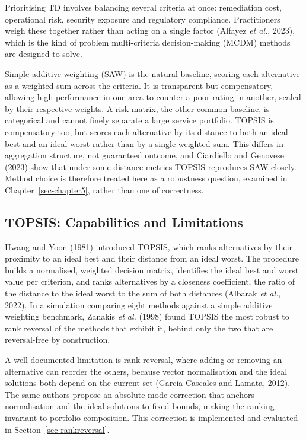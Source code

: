 \documentclass[
  12pt,
  letterpaper,
  12pt,
  oneside,
  english,
  onehalfspacing,
  headsepline]{MastersDoctoralThesis}
\begin{document}
Prioritising TD involves balancing several criteria at once: remediation
cost, operational risk, security exposure and regulatory compliance.
Practitioners weigh these together rather than acting on a single factor
(Alfayez \emph{et al.}, 2023), which is the kind of problem
multi-criteria decision-making (MCDM) methods are designed to solve.

Simple additive weighting (SAW) is the natural baseline, scoring each
alternative as a weighted sum across the criteria. It is transparent but
compensatory, allowing high performance in one area to counter a poor
rating in another, scaled by their respective weights. A risk matrix,
the other common baseline, is categorical and cannot finely separate a
large service portfolio. TOPSIS is compensatory too, but scores each
alternative by its distance to both an ideal best and an ideal worst
rather than by a single weighted sum. This differs in aggregation
structure, not guaranteed outcome, and Ciardiello and Genovese (2023)
show that under some distance metrics TOPSIS reproduces SAW closely.
Method choice is therefore treated here as a robustness question,
examined in Chapter~\ref{sec-chapter5}, rather than one of correctness.

\subsection{TOPSIS: Capabilities and
Limitations}\label{topsis-capabilities-and-limitations}

Hwang and Yoon (1981) introduced TOPSIS, which ranks alternatives by
their proximity to an ideal best and their distance from an ideal worst.
The procedure builds a normalised, weighted decision matrix, identifies
the ideal best and worst value per criterion, and ranks alternatives by
a closeness coefficient, the ratio of the distance to the ideal worst to
the sum of both distances (Albarak \emph{et al.}, 2022). In a simulation
comparing eight methods against a simple additive weighting benchmark,
Zanakis \emph{et al.} (1998) found TOPSIS the most robust to rank
reversal of the methods that exhibit it, behind only the two that are
reversal-free by construction.

A well-documented limitation is rank reversal, where adding or removing
an alternative can reorder the others, because vector normalisation and
the ideal solutions both depend on the current set (García-Cascales and
Lamata, 2012). The same authors propose an absolute-mode correction that
anchors normalisation and the ideal solutions to fixed bounds, making
the ranking invariant to portfolio composition. This correction is
implemented and evaluated in Section~\ref{sec-rankreversal}.
\end{document}
